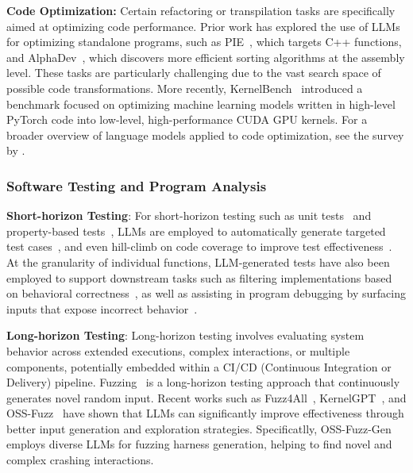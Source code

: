 % 
% 


\textbf{Code Optimization:}
Certain refactoring or transpilation tasks are specifically aimed at optimizing code performance. 
Prior work has explored the use of LLMs for optimizing standalone programs, such as PIE~\citep{pie}, which targets C++ functions, and AlphaDev~\citep{alphadev}, which discovers more efficient sorting algorithms at the assembly level. 
These tasks are particularly challenging due to the vast search space of possible code transformations. 
More recently, KernelBench~\citep{ouyang2024kernelbench} introduced a benchmark focused on optimizing machine learning models written in high-level PyTorch code into low-level, high-performance CUDA GPU kernels. 
For a broader overview of language models applied to code optimization, see the survey by \citet{gong2025language}.

% 




\subsubsection{Software Testing and Program Analysis}
\label{sec:related-software-testing-and-program-analysis}

\textbf{Short-horizon Testing}:
For short-horizon testing such as unit tests~\citep{lemieux2023codamosa} and property-based tests~\citep{vikram2023can}, 
LLMs are employed to automatically generate targeted test cases~\citep{li2024largelanguagemodelstest, mundler2025swt}, and even hill-climb on code coverage to improve test effectiveness~\citep{ryan2024code}. 
At the granularity of individual functions, LLM-generated tests have also been employed to support downstream tasks such as filtering implementations based on behavioral correctness~\citep{chen2022codet, zhang2023algo}, as well as assisting in program debugging by surfacing inputs that expose incorrect behavior~\citep{chen2025revisit}.

\textbf{Long-horizon Testing}:
Long-horizon testing involves evaluating system behavior across extended executions, complex interactions, or multiple components, potentially embedded within a CI/CD (Continuous Integration or Delivery) pipeline.
Fuzzing~\citep{miller1990empirical} is a long-horizon testing approach that continuously generates novel random input. 
Recent works such as Fuzz4All~\citep{xia2024fuzz4all}, KernelGPT~\citep{yang2023kernelgpt}, and OSS-Fuzz~\citep{ossfuzzllm, ossfuzzllm-results} have shown that LLMs can significantly improve effectiveness through better input generation and exploration strategies.
Specificatlly, OSS-Fuzz-Gen~\citep{liu2024ossfuzzgen} employs diverse LLMs for fuzzing harness generation, helping to find novel and complex crashing interactions.

